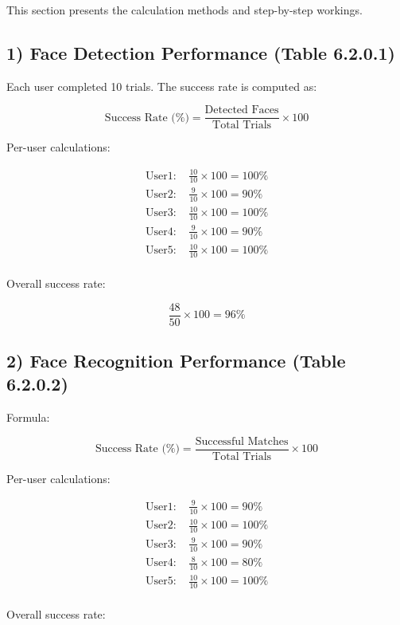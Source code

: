 This section presents the calculation methods and step-by-step workings.

\subsection*{1) Face Detection Performance (Table 6.2.0.1)}

Each user completed 10 trials. The success rate is computed as:

\[
\text{Success Rate (\%)} = \frac{\text{Detected Faces}}{\text{Total Trials}} \times 100
\]

Per-user calculations:

\[
\begin{aligned}
\text{User1: } & \frac{10}{10} \times 100 = 100\% \\
\text{User2: } & \frac{9}{10} \times 100 = 90\% \\
\text{User3: } & \frac{10}{10} \times 100 = 100\% \\
\text{User4: } & \frac{9}{10} \times 100 = 90\% \\
\text{User5: } & \frac{10}{10} \times 100 = 100\% \\
\end{aligned}
\]

Overall success rate:

\[
\frac{48}{50} \times 100 = 96\%
\]

\subsection*{2) Face Recognition Performance (Table 6.2.0.2)}

Formula:

\[
\text{Success Rate (\%)} = \frac{\text{Successful Matches}}{\text{Total Trials}} \times 100
\]

Per-user calculations:

\[
\begin{aligned}
\text{User1: } & \frac{9}{10} \times 100 = 90\% \\
\text{User2: } & \frac{10}{10} \times 100 = 100\% \\
\text{User3: } & \frac{9}{10} \times 100 = 90\% \\
\text{User4: } & \frac{8}{10} \times 100 = 80\% \\
\text{User5: } & \frac{10}{10} \times 100 = 100\% \\
\end{aligned}
\]

Overall success rate:

